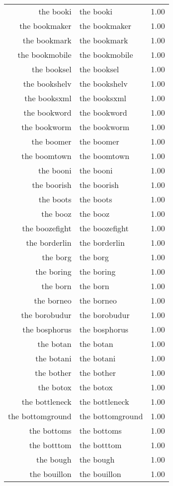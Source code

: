 \begin{table}[ht]
\begin{tabular}{rlr}
  the booki & the booki & 1.00 \\ 
  the bookmaker & the bookmaker & 1.00 \\ 
  the bookmark & the bookmark & 1.00 \\ 
  the bookmobile & the bookmobile & 1.00 \\ 
  the booksel & the booksel & 1.00 \\ 
  the bookshelv & the bookshelv & 1.00 \\ 
  the booksxml & the booksxml & 1.00 \\ 
  the bookword & the bookword & 1.00 \\ 
  the bookworm & the bookworm & 1.00 \\ 
  the boomer & the boomer & 1.00 \\ 
  the boomtown & the boomtown & 1.00 \\ 
  the booni & the booni & 1.00 \\ 
  the boorish & the boorish & 1.00 \\ 
  the boots & the boots & 1.00 \\ 
  the booz & the booz & 1.00 \\ 
  the boozefight & the boozefight & 1.00 \\ 
  the borderlin & the borderlin & 1.00 \\ 
  the borg & the borg & 1.00 \\ 
  the boring & the boring & 1.00 \\ 
  the born & the born & 1.00 \\ 
  the borneo & the borneo & 1.00 \\ 
  the borobudur & the borobudur & 1.00 \\ 
  the bosphorus & the bosphorus & 1.00 \\ 
  the botan & the botan & 1.00 \\ 
  the botani & the botani & 1.00 \\ 
  the bother & the bother & 1.00 \\ 
  the botox & the botox & 1.00 \\ 
  the bottleneck & the bottleneck & 1.00 \\ 
  the bottomground & the bottomground & 1.00 \\ 
  the bottoms & the bottoms & 1.00 \\ 
  the botttom & the botttom & 1.00 \\ 
  the bough & the bough & 1.00 \\ 
  the bouillon & the bouillon & 1.00 \\ 

\end{tabular}
\end{table}
